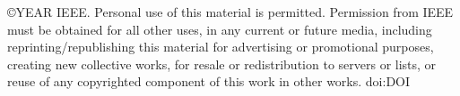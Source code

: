 \documentclass[a4paper,english,9pt]{article}
\begin{document}
\setlength{\parindent}{0in}

\thispagestyle{empty}
\footnotesize
\copyright YEAR IEEE. Personal use of this material is permitted. Permission from IEEE must be obtained for all other uses, in any current or future media, including reprinting/republishing this material for advertising or promotional purposes, creating new collective works, for resale or redistribution to servers or lists, or reuse of any copyrighted component of this work in other works. doi:DOI
\end{document}
